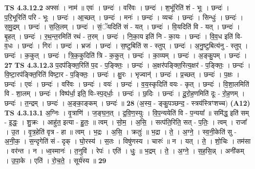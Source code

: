 \documentclass[17pt]{extarticle}
\begin{document}
                  \newline
                                \textbf{ TS 4.3.12.2} \newline
                  अफ्सः॑ । नाम॑ ॥ एवः॑ । छन्दः॑ । वरि॑वः । छन्दः॑ । श॒भूंरिति॑ शं - भूः । छन्दः॑ । प॒रि॒भूरिति॑ परि - भूः । छन्दः॑ । आ॒च्छत् । छन्दः॑ । मनः॑ । छन्दः॑ । व्यचः॑ । छन्दः॑ । सिन्धुः॑ । छन्दः॑ । स॒मु॒द्रम् । छन्दः॑ । स॒लि॒लम् । छन्दः॑ । सं॒ॅयदिति॑ सं - यत् । छन्दः॑ । वि॒यदिति॑ वि - यत् । छन्दः॑ । बृ॒हत् । छन्दः॑ । र॒थ॒न्त॒रमिति॑ रथं - त॒रम् । छन्दः॑ । नि॒का॒य इति॑ नि - का॒यः । छन्दः॑ । वि॒व॒ध इति॑ वि-व॒धः । छन्दः॑ । गिरः॑ । छन्दः॑ । भ्रजः॑ । छन्दः॑ । स॒ष्टुबिति॑ स - स्तुप् । छन्दः॑ । अ॒नु॒ष्टुबित्य॑नु - स्तुप् । छन्दः॑ । क॒कुत् । छन्दः॑ । त्रि॒क॒कुदिति॑ त्रि - क॒कुत् । छन्दः॑ । का॒व्यम् । छन्दः॑ । अ॒ङ्कु॒पम् । छन्दः॑ । \textbf{  27} \newline
                  \newline
                                \textbf{ TS 4.3.12.3} \newline
                  प॒दप॑ङ्क्ति॒रिति॑ प॒द - प॒ङ्क्तिः॒ । छन्दः॑ । अ॒क्षर॑पङ्क्ति॒रित्य॒क्षर॑ - प॒ङ्क्तिः॒ । छन्दः॑ । वि॒ष्टा॒रप॑ङ्क्ति॒रिति॑ विष्टा॒र - प॒ङ्क्तिः॒ । छन्दः॑ । क्षु॒रः । भृज्वान्॑ । छन्दः॑ । प्र॒च्छत् । छन्दः॑ । प॒क्षः । छन्दः॑ । एवः॑ । छन्दः॑ । वरि॑वः । छन्दः॑ । वयः॑ । छन्दः॑ । व॒य॒स्कृदिति॑ वयः - कृत् । छन्दः॑ । वि॒शा॒लमिति॑ वि - शा॒लम् । छन्दः॑ । विष्प॑र्धा॒ इति॒ विः-स्प॒द्‌र्धाः॒ । छन्दः॑ । छ॒दिः । छन्दः॑ । दू॒रो॒ह॒णमिति॑ दूः - रो॒ह॒णम् । छन्दः॑ । त॒न्द्रम् । छन्दः॑ । अ॒ङ्का॒ङ्कम् । छन्दः॑ ॥ \textbf{  28 } \newline
                  \newline
                      (अ॒स्य॒ - ङ्कु॒पञ्छन्द॒ - स्त्रय॑स्त्रिꣳशच्च)  \textbf{(A12)} \newline \newline
                                \textbf{ TS 4.3.13.1} \newline
                  अ॒ग्निः । वृ॒त्राणि॑ । ज॒ङ्घ॒न॒त् । द्र॒वि॒ण॒स्युः । वि॒प॒न्ययेति॑ वि - प॒न्यया᳚ ॥ समि॑द्ध॒ इति॑ सम् - इ॒द्धः॒ । शु॒क्रः । आहु॑त॒ इत्या - हु॒तः॒ ॥ त्वम् । सो॒म॒ । अ॒सि॒ । सत्प॑ति॒रिति॒ सत् - प॒तिः॒ । त्वम् । राजा᳚ । उ॒त । वृ॒त्र॒हेति॑ वृत्र - हा ॥ त्वम् । भ॒द्रः । अ॒सि॒ । क्रतुः॑ ॥ भ॒द्रा । ते॒ । अ॒ग्ने॒ । स्व॒नी॒केति॑ सु - अ॒नी॒क॒ । स॒न्दृगेति॑ सं - दृक् । घो॒रस्य॑ । स॒तः । विषु॑णस्य । चारुः॑ ॥ न । यत् । ते॒ । शो॒चिः । तम॑सा । वर॑न्त । न । ध्व॒स्मानः॑ । त॒नुवि॑ । रेपः॑ । एति॑ । धुः॒ ॥ भ॒द्रम् । ते॒ । अ॒ग्ने॒ । स॒ह॒सि॒न्न् । अनी॑कम् । उ॒पा॒के । एति॑ । रो॒च॒ते॒ । सूर्य॑स्य ॥ \textbf{  29} \newline
\end{document}
